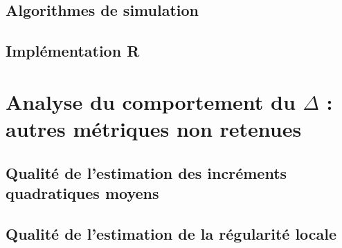 \label{annexe:code}
\section{Algorithmes de simulation}



\pagebreak

\section{Implémentation R}
\label{annexe:code-R}



\chapter{
  Analyse du comportement du $\Delta$ : autres métriques non retenues
 }

\section{Qualité de l'estimation des incréments quadratiques moyens}


\section{Qualité de l'estimation de la régularité locale}


